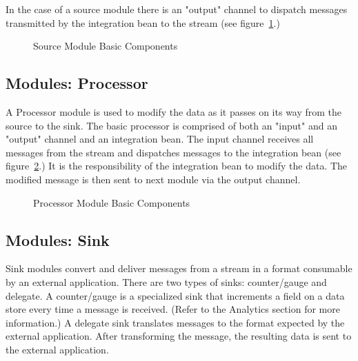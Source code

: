 \par

In the case of a source module there is an "output" channel to dispatch messages 
transmitted by the integration bean to the stream (see figure~\ref{fig:sourcembc}.)

\par

\begin{figure}[ht]
\centering
{}
\caption{Source Module Basic Components}
\label{fig:sourcembc}
\end{figure}

\par

\subsection{Modules: Processor}
A Processor module is used to modify the data as it passes on its way from the source to 
the sink.  The basic processor is comprised of both an "input" and an "output" channel 
and an integration bean.
The input channel receives all messages from the stream and dispatches
messages to the integration bean (see figure~\ref{fig:processormbc}.) It is the responsibility of
the integration bean to modify the data. The modified message is then sent to next module 
via the output channel.  

\par

\begin{figure}
\centering
{}
\caption{Processor Module Basic Components}
\label{fig:processormbc}
\end{figure}

\par

\subsection{Modules: Sink}
Sink modules convert and deliver messages from a stream in a format consumable by 
an external application.  There are two types of sinks: counter/gauge and delegate.
A counter/gauge is a specialized sink that increments a field on a data store every time a
message is received. (Refer to the Analytics section for more information.)  A delegate
sink translates messages to the format expected by the external application.
After transforming the message, the resulting data is sent to the external application.

